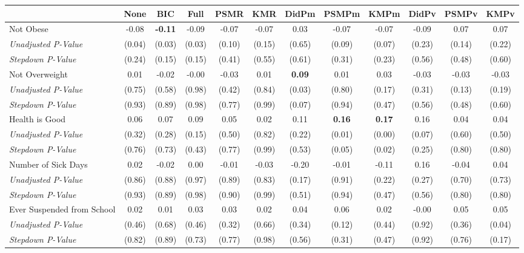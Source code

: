 \begin{tabular}{l c c c c c c c c c c c}
\toprule
 & None & BIC & Full & PSMR & KMR & DidPm & PSMPm & KMPm & DidPv & PSMPv & KMPv \\
\midrule
Not Obese & -0.08 & \textbf{ -0.11 } & -0.09 & -0.07 & -0.07 & 0.03 & -0.07 & -0.07 & -0.09 & 0.07 & 0.07 \\
\quad \textit{Unadjusted P-Value} & (0.04) & (0.03) & (0.03) & (0.10) & (0.15) & (0.65) & (0.09) & (0.07) & (0.23) & (0.14) & (0.22) \\
\quad \textit{Stepdown P-Value} & (0.24) & (0.15) & (0.15) & (0.41) & (0.55) & (0.61) & (0.31) & (0.23) & (0.56) & (0.48) & (0.60) \\
Not Overweight & 0.01 & -0.02 & -0.00 & -0.03 & 0.01 & \textbf{ 0.09 } & 0.01 & 0.03 & -0.03 & -0.03 & -0.03 \\
\quad \textit{Unadjusted P-Value} & (0.75) & (0.58) & (0.98) & (0.42) & (0.84) & (0.03) & (0.80) & (0.17) & (0.31) & (0.13) & (0.19) \\
\quad \textit{Stepdown P-Value} & (0.93) & (0.89) & (0.98) & (0.77) & (0.99) & (0.07) & (0.94) & (0.47) & (0.56) & (0.48) & (0.60) \\
Health is Good & 0.06 & 0.07 & 0.09 & 0.05 & 0.02 & 0.11 & \textbf{ 0.16 } & \textbf{ 0.17 } & 0.16 & 0.04 & 0.04 \\
\quad \textit{Unadjusted P-Value} & (0.32) & (0.28) & (0.15) & (0.50) & (0.82) & (0.22) & (0.01) & (0.00) & (0.07) & (0.60) & (0.50) \\
\quad \textit{Stepdown P-Value} & (0.76) & (0.73) & (0.43) & (0.77) & (0.99) & (0.53) & (0.05) & (0.02) & (0.25) & (0.80) & (0.80) \\
Number of Sick Days & 0.02 & -0.02 & 0.00 & -0.01 & -0.03 & -0.20 & -0.01 & -0.11 & 0.16 & -0.04 & 0.04 \\
\quad \textit{Unadjusted P-Value} & (0.86) & (0.88) & (0.97) & (0.89) & (0.83) & (0.17) & (0.91) & (0.22) & (0.27) & (0.70) & (0.73) \\
\quad \textit{Stepdown P-Value} & (0.93) & (0.89) & (0.98) & (0.90) & (0.99) & (0.51) & (0.94) & (0.47) & (0.56) & (0.80) & (0.80) \\
Ever Suspended from School & 0.02 & 0.01 & 0.03 & 0.03 & 0.02 & 0.04 & 0.06 & 0.02 & -0.00 & 0.05 & 0.05 \\
\quad \textit{Unadjusted P-Value} & (0.46) & (0.68) & (0.46) & (0.32) & (0.66) & (0.34) & (0.12) & (0.44) & (0.92) & (0.36) & (0.04) \\
\quad \textit{Stepdown P-Value} & (0.82) & (0.89) & (0.73) & (0.77) & (0.98) & (0.56) & (0.31) & (0.47) & (0.92) & (0.76) & (0.17) \\
\bottomrule
\end{tabular}
